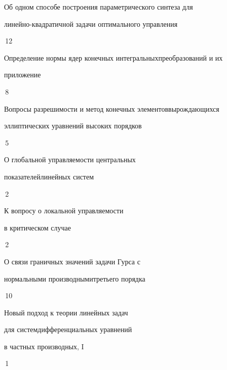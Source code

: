 

{Об одном способе построения параметрического синтеза для\newline


линейно-квадратичной задачи оптимального управления}{\No\,12}




{Определение нормы ядер конечных интегральных\newline преобразований и их 


приложение}{\No\,8}




{Вопросы разрешимости и метод конечных элементов\newline вырождающихся


эллиптических уравнений высоких порядков}{\No\,5}






{О глобальной управляемости центральных


показателей\newline линейных систем}{\No\,2}




{К вопросу о локальной управляемости


в критическом случае}{\No\,2}






{О связи граничных значений задачи Гурса с 


нормальными производными\newline третьего порядка}{\No\,10}




{Новый подход к теории линейных задач 


для систем\newline дифференциальных уравнений 


в частных производных, I}{\No\,1}


